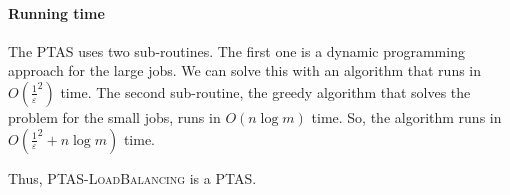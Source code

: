 \begin{enumerate}[(i)]
	\paragraph{Running time} The PTAS uses two sub-routines.
		The first one is a dynamic programming approach for the large jobs.
		We can solve this with an algorithm that runs in $O(\frac{1}{\varepsilon}^2)$ time.
		The second sub-routine, the greedy algorithm that solves the problem for the small jobs, runs in $O(n\log{m})$ time.
		So, the algorithm runs in $O(\frac{1}{\varepsilon}^2 + n\log{m})$ time.

	Thus, \textsc{PTAS-LoadBalancing} is a PTAS.
\end{enumerate}
